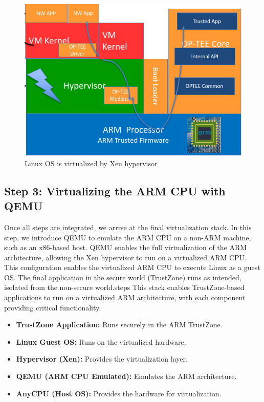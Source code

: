 \documentclass[acmtog]{acmart}
\begin{document}
\begin{figure}[ht]
  \centering
  \includegraphics[width=\columnwidth]{images/env_2_add_hyperv.png}
  \caption{Linux OS is virtualized by Xen hypervisor}
  \label{fig:image_label}
\end{figure}


\subsection{Step 3: Virtualizing the ARM CPU with QEMU}
Once all steps are integrated, we arrive at the final virtualization stack. In this step, we introduce QEMU to emulate the ARM CPU on a non-ARM machine, such as an x86-based host. QEMU enables the full virtualization of the ARM architecture, allowing the Xen hypervisor to run on a virtualized ARM CPU. This configuration enables the virtualized ARM CPU to execute Linux as a guest OS. The final application in the secure world (TrustZone) runs as intended, isolated from the non-secure world.steps   This stack enables TrustZone-based applications to run on a virtualized ARM architecture, with each component providing critical functionality.

\begin{itemize}
    \item \textbf{TrustZone Application:} Runs securely in the ARM TrustZone.
    \item \textbf{Linux Guest OS:} Runs on the virtualized hardware.  
    \item \textbf{Hypervisor (Xen):} Provides the virtualization layer.  
    \item \textbf{QEMU (ARM CPU Emulated):} Emulates the ARM architecture.  
    \item \textbf{AnyCPU (Host OS):} Provides the hardware for virtualization.
\end{itemize}
\end{document}
